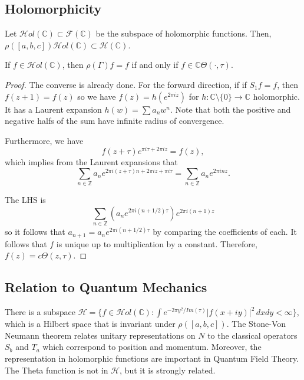 \documentclass[12pt]{scrartcl}
\newcommand{\Z}{\mathbb{Z}}
\newcommand{\C}{\mathbb C}
\let \mc \mathcal
\begin{document}
\subsection{Holomorphicity}
Let $\mc Hol(\C) \subset \mc F(\C)$ be the subspace of holomorphic functions.  Then, $\rho([a, b, c]) \mc Hol(\C) \subset \mc H(\C)$.
\begin{fact} If $f \in \mc Hol(\C)$, then $\rho(\Gamma) f = f$ if and only if $f \in \C \Theta(\cdot, \tau)$.
\end{fact}
\begin{proof}
The converse is already done.  For the forward direction, if if $S_1f = f$, then $f(z + 1) = f(z)$ so we have $f(z) = h(e^{2\pi i z})$ for $h: \C \setminus \{0\} \to \C$ holomorphic.  It has a Laurent expansion $h(w) = \sum a_n w^n$.  Note that both the positive and negative halfs of the sum have infinite radius of convergence.  

Furthermore, we have 
$$f(z + \tau) e^{\pi i \tau + 2 \pi i z} = f(z),$$
which implies from the Laurent expansions that
$$\sum_{n \in \Z} a_n e^{2 \pi i (z + \tau) n + 2 \pi i  z + \pi i \tau} = \sum_{n \in \Z} a_n e^{2 \pi i n z}.$$

The LHS is 
$$\sum_{n \in \Z} (a_n e^{2 \pi i (n + 1/2) \tau}) e^{2 \pi i (n + 1 )z}$$
so it follows that $a_{n + 1} = a_n e^{2 \pi i (n + 1/2)\tau}$ by comparing the coefficients of each.    It follows that $f$ is unique up to multiplication by a constant.  Therefore, $f(z) = c \Theta(z, \tau)$.
\end{proof}

\subsection{Relation to Quantum Mechanics}
There is a subspace $\mc H = \{f \in \mc Hol(\C) : \int e^{-2 \pi y^2 / Im(\tau)}|f(x + iy)|^2 \,dx dy < \infty\}$, which is a Hilbert space that is invariant under $\rho([a, b, c])$.  The Stone-Von Neumann theorem relates unitary representations on $N$ to the classical operators $S_b$ and $T_a$ which correspond to position and momentum.      Moreover, the representation in holomorphic functions are important in Quantum Field Theory.  The Theta function is not in $\mc H$, but it is strongly related.  
\end{document}
